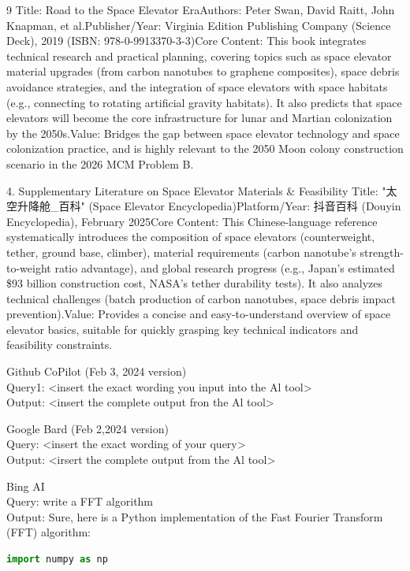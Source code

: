 \begin{ReportAiUse}{9}
Title: Road to the Space Elevator EraAuthors: Peter Swan, David Raitt, John Knapman, et al.Publisher/Year: Virginia Edition Publishing Company (Science Deck), 2019 (ISBN: 978-0-9913370-3-3)Core Content: This book integrates technical research and practical planning, covering topics such as space elevator material upgrades (from carbon nanotubes to graphene composites), space debris avoidance strategies, and the integration of space elevators with space habitats (e.g., connecting to rotating artificial gravity habitats). It also predicts that space elevators will become the core infrastructure for lunar and Martian colonization by the 2050s.Value: Bridges the gap between space elevator technology and space colonization practice, and is highly relevant to the 2050 Moon colony construction scenario in the 2026 MCM Problem B.

4. Supplementary Literature on Space Elevator Materials & Feasibility
Title: "太空升降舱_百科" (Space Elevator Encyclopedia)Platform/Year: 抖音百科 (Douyin Encyclopedia), February 2025Core Content: This Chinese-language reference systematically introduces the composition of space elevators (counterweight, tether, ground base, climber), material requirements (carbon nanotube’s strength-to-weight ratio advantage), and global research progress (e.g., Japan’s estimated \$93 billion construction cost, NASA’s tether durability tests). It also analyzes technical challenges (batch production of carbon nanotubes, space debris impact prevention).Value: Provides a concise and easy-to-understand overview of space elevator basics, suitable for quickly grasping key technical indicators and feasibility constraints.

Github CoPilot (Feb 3, 2024 version)\\
Query1: <insert the exact wording you input into the Al tool>\\
Output: <insert the complete output fron the Al tool>

Google Bard (Feb 2,2024 version)\\
Query: <insert the exact wording of your query>\\
Output: <irsert the complete output from the Al tool>

Bing AI\\
Query: write a FFT algorithm\\
Output: Sure, here is a Python implementation of the Fast Fourier Transform (FFT) algorithm:
\begin{lstlisting}[language=python]
import numpy as np


\end{lstlisting}
\end{ReportAiUse}
